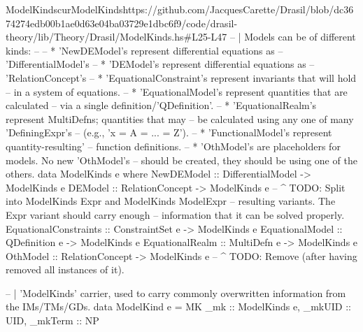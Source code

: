 \begin{haskell}{ModelKinds}{curModelKinds}{}{https://github.com/JacquesCarette/Drasil/blob/dc3674274edb00b1ae0d63e04ba03729e1dbc6f9/code/drasil-theory/lib/Theory/Drasil/ModelKinds.hs\#L25-L47}
-- | Models can be of different kinds: 
--
--   * 'NewDEModel's represent differential equations as 
--     'DifferentialModel's
--   * 'DEModel's represent differential equations as 
--     'RelationConcept's
--   * 'EquationalConstraint's represent invariants that will hold 
--     in a system of equations.
--   * 'EquationalModel's represent quantities that are calculated
--     via a single definition/'QDefinition'.
--   * 'EquationalRealm's represent MultiDefns; quantities that may
--     be calculated using any one of many 'DefiningExpr's
--     (e.g., 'x = A = ... = Z').
--   * 'FunctionalModel's represent quantity-resulting'
--     function definitions.
--   * 'OthModel's are placeholders for models. No new 'OthModel's 
--     should be created, they should be using one of the others.
data ModelKinds e where
  NewDEModel            :: DifferentialModel -> ModelKinds e
  DEModel               :: RelationConcept   -> ModelKinds e 
  -- ^ TODO: Split into ModelKinds Expr and ModelKinds ModelExpr
  --   resulting variants. The Expr variant should carry enough
  --   information that it can be solved properly.
  EquationalConstraints :: ConstraintSet e   -> ModelKinds e
  EquationalModel       :: QDefinition e     -> ModelKinds e
  EquationalRealm       :: MultiDefn e       -> ModelKinds e
  OthModel              :: RelationConcept   -> ModelKinds e 
  -- ^ TODO: Remove (after having removed all instances of it).


-- | 'ModelKinds' carrier, used to carry commonly overwritten information from the IMs/TMs/GDs.
data ModelKind e = MK {
  _mk     :: ModelKinds e,
  _mkUID  :: UID,
  _mkTerm :: NP
}
\end{haskell}

